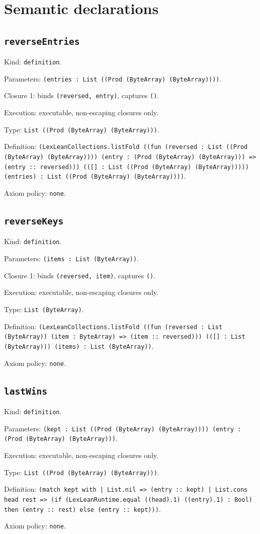 \documentclass[11pt]{article}
\begin{document}
\section*{Semantic declarations}
\subsection*{\texttt{reverseEntries}}
\noindent Kind: \texttt{definition}.\par
\noindent Parameters: \texttt{(entries : List ((Prod (ByteArray) (ByteArray))))}.\par
\noindent Closure 1: binds \texttt{(reversed, entry)}, captures \texttt{()}.\par
\noindent Execution: executable, non-escaping closures only.\par
\noindent Type: \texttt{List ((Prod (ByteArray) (ByteArray)))}.\par
\noindent Definition: \texttt{(LexLeanCollections.listFold ((fun (reversed : List ((Prod (ByteArray) (ByteArray)))) (entry : (Prod (ByteArray) (ByteArray))) => (entry :: reversed))) (([] : List ((Prod (ByteArray) (ByteArray))))) (entries) : List ((Prod (ByteArray) (ByteArray))))}.\par
\noindent Axiom policy: \texttt{none}.\par
\subsection*{\texttt{reverseKeys}}
\noindent Kind: \texttt{definition}.\par
\noindent Parameters: \texttt{(items : List (ByteArray))}.\par
\noindent Closure 1: binds \texttt{(reversed, item)}, captures \texttt{()}.\par
\noindent Execution: executable, non-escaping closures only.\par
\noindent Type: \texttt{List (ByteArray)}.\par
\noindent Definition: \texttt{(LexLeanCollections.listFold ((fun (reversed : List (ByteArray)) (item : ByteArray) => (item :: reversed))) (([] : List (ByteArray))) (items) : List (ByteArray))}.\par
\noindent Axiom policy: \texttt{none}.\par
\subsection*{\texttt{lastWins}}
\noindent Kind: \texttt{definition}.\par
\noindent Parameters: \texttt{(kept : List ((Prod (ByteArray) (ByteArray)))) (entry : (Prod (ByteArray) (ByteArray)))}.\par
\noindent Execution: executable, non-escaping closures only.\par
\noindent Type: \texttt{List ((Prod (ByteArray) (ByteArray)))}.\par
\noindent Definition: \texttt{(match kept with | List.nil => (entry :: kept) | List.cons head rest => (if (LexLeanRuntime.equal ((head).1) ((entry).1) : Bool) then (entry :: rest) else (entry :: kept)))}.\par
\noindent Axiom policy: \texttt{none}.\par
\end{document}
